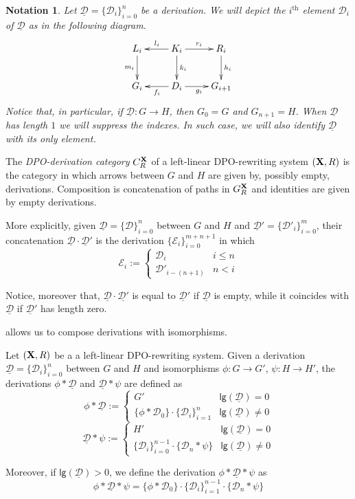 \documentclass[a4paper,UKenglish,cleveref,pdftex, thm-restate,numberwithinsect]{lipics}
\newcommand{\dpo}{\textsc{dpo}}
\def\R{\mathsf{R}}
\def\X{\textbf {\textup{X}}}
\newcommand{\dder}[1]{\mathscr{#1}}
\newcommand{\der}[1]{\underline{\dder{#1}}}
\def\dpo{\mathsf{C}^{\X}_R}
\def\gpo{\mathsf{G}^{\X}_R}
\newcommand{\lgh}[0]{\mathsf{lg}}
\newtheorem*{notation}{Notation}
\begin{document}
\begin{notation}Let $\der{D}=\{\dder{D}_i\}_{i=0}^n$ be a derivation. We will depict the $i^\text{th}$ element $\dder{D}_i$ of $\der{D}$ as in the following diagram.  
	\[\xymatrix{L_i \ar[d]_{m_i}& K_i \ar[d]^{k_i}\ar[l]_{l_i} \ar[r]^{r_i} & R_i \ar[d]^{h_i} \\G_{i} & \ar[l]^{f_{i}} D_{i} \ar[r]_{g_{i}}& G_{i+1} }\]
	Notice that, in particular, if $\der{D}\colon G\to H$, then $G_0=G$ and $G_{n+1}=H$. When $\der{D}$ has length $1$ we will suppress the indexes. In such case, we will also identify $\der{D}$ with its only element. 
\end{notation} 

\begin{example}
\end{example}

\begin{definition}
	The \emph{DPO-derivation category} $\dpo$ of a left-linear DPO-rewriting system $(\X, \R)$ is the category in which arrows between $G$ and $H$ are given by, possibly empty, derivations. Composition is concatenation of paths in $\gpo$ and identities are given by empty derivations.
\end{definition} 	
\begin{remark}
	More explicitly, given $\der{D}=\{\dder{D}\}_{i=0}^n$ between $G$ and $H$ and $\der{D}'=\{\dder{D}'_i\}_{i=0}^m$, their concatenation $\der{D}\cdot\der{D}'$ is the derivation $\{\dder{E}_i\}_{i=0}^{m+n+1}$ in which
	\[\dder{E}_i:=\begin{cases}
		\dder{D}_i & i \leq n\\
		\dder{D}'_{i-(n+1)} & n< i 
	\end{cases}\]	

Notice, moreover that, $\der{D}\cdot \der{D'}$ is equal to $\der{D}'$ if $\der{D}$ is empty, while it coincides with $\der{D}$ if $\der{D}'$ has length zero.
\end{remark}

  allows us to compose derivations with isomorphisms.

\begin{definition} Let $(\X, \R)$ be a a left-linear DPO-rewriting system. Given a derivation $\der{D}=\{\dder{D}_{i}\}_{i=0}^n$ between $G$ and $H$ and isomorphisms $\phi\colon G\to G'$, $\psi\colon H\to H'$, the derivations  $\phi*\der{D}$ and $\der{D}*\psi$ are defined as
	\[\phi *\der{D} := \begin{cases}
		G' & \lgh(\der{D})=0\\ 
		\{\phi* \dder{D}_0\}\cdot \{\dder{D}_i\}_{i=1}^{n}  & \lgh(\der{D})\neq 0
	\end{cases}\] 
	\[\der{D}*\psi := \begin{cases}
		H' & \lgh(\der{D})=0\\ 
		 \{\dder{D}_i\}_{i=0}^{n-1} \cdot \{\dder{D}_n*\psi\} & \lgh(\der{D})\neq 0
	\end{cases}\] 

	Moreover, if $\lgh(\der{D})>0$,  we define the derivation $\phi *\der{D} * \psi$ as
	\[\phi *\der{D} * \psi = \{\phi* \dder{D}_0\}\cdot \{\dder{D}_i\}_{i=1}^{n-1} \cdot \{\dder{D}_n*\psi\}\] 
\end{definition}
\end{document}
